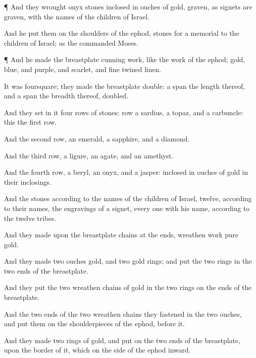 {\par }{\PP {}¶ And they
wrought
onyx
stones
inclosed in
ouches of
gold,
graven, as
signets are
graven, with the
names of the
children of
Israel.

And he
put them on the
shoulders of the
ephod,
{}
stones for a
memorial to the
children of
Israel; as the
{}
commanded
Moses.


\par }{\PP {}¶ And he
made the
breastplate
{}
cunning
work, like the
work of the
ephod;
{}
gold,
blue, and
purple, and
scarlet, and fine
twined
linen.

It was
foursquare; they
made the
breastplate
double: a
span
{} the
length thereof, and a
span the
breadth thereof,
{}
doubled.

And they
set in it
four
rows of
stones:
{}
row
{} a
sardius, a
topaz, and a
carbuncle: this
{} the
first
row.

And the
second
row, an
emerald, a
sapphire, and a
diamond.

And the
third
row, a
ligure, an
agate, and an
amethyst.

And the
fourth
row, a
beryl, an
onyx, and a
jasper:
{}
inclosed in
ouches of
gold in their
inclosings.

And the
stones
{} according to the
names of the
children of
Israel,
twelve, according to their
names,
{} the
engravings of a
signet, every
one with his
name, according to the
twelve
tribes.

And they
made upon the
breastplate
chains at the
ends,
{}
wreathen
work
{}
pure
gold.

And they
made
two
ouches
{}
gold, and
two
gold
rings; and
put the
two
rings in the
two
ends of the
breastplate.

And they
put the
two wreathen
chains of
gold in the
two
rings on the
ends of the
breastplate.

And the
two
ends of the
two
wreathen
chains they
fastened in the
two
ouches, and
put them on the
shoulderpieces of the
ephod,
before
it.

And they
made
two
rings of
gold, and
put
{} on the
two
ends of the
breastplate, upon the
border of it, which
{} on the
side of the
ephod
inward.

}
